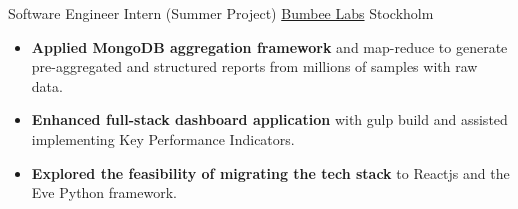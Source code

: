 {Software Engineer Intern (Summer Project)}
{\href{https://bumbeelabs.com/}{Bumbee Labs}}
{Stockholm \Large{}}{}
{
  \begin{itemize}[itemsep=0.07pt, topsep=0.5pt]
    \item \textbf{Applied MongoDB aggregation framework} and map-reduce to generate pre-aggregated and structured reports from millions of samples with raw data.
    \item \textbf{Enhanced full-stack dashboard application} with gulp build and assisted implementing Key Performance Indicators.
    \item \textbf{Explored the feasibility of migrating the tech stack} to Reactjs and the Eve Python framework.
  \end{itemize}
}
